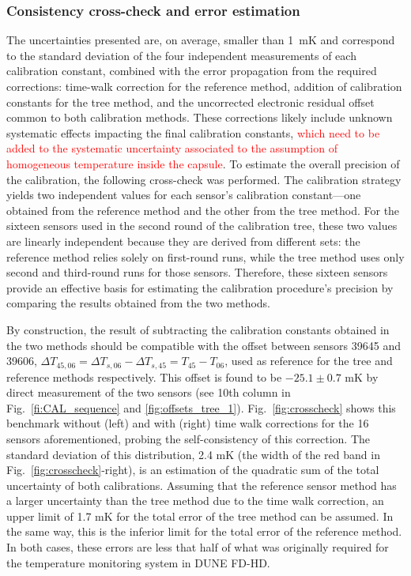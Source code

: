 \subsubsection{Consistency cross-check and error estimation}
\label{sec:crossCheck}
\noindent The uncertainties presented are, on average, smaller than 1~mK and correspond to the standard deviation of the four independent measurements of each calibration constant, combined with the error propagation from the required corrections: time-walk correction for the reference method, addition of calibration constants for the tree method, and the uncorrected electronic residual offset common to both calibration methods. These corrections likely include unknown systematic effects impacting the final calibration constants, \textcolor{red}{which need to be added to the systematic uncertainty associated to the assumption of homogeneous temperature inside the capsule}. To estimate the overall precision of the calibration, the following cross-check was performed. The calibration strategy yields two independent values for each sensor’s calibration constant—one obtained from the reference method and the other from the tree method. For the sixteen sensors used in the second round of the calibration tree, these two values are linearly independent because they are derived from different sets: the reference method relies solely on first-round runs, while the tree method uses only second and third-round runs for those sensors. Therefore, these sixteen sensors provide an effective basis for estimating the calibration procedure’s precision by comparing the results obtained from the two methods.

By construction, the result of subtracting the calibration constants obtained in the two methods should be compatible with the offset between sensors 39645 and 39606, $\Delta T_{45,06} = \Delta T_{s,06}-\Delta T_{s,45} = T_{45}-T_{06}$, used as reference for the tree and reference methods respectively. This offset is found to be $-25.1 \pm 0.7$ mK by direct measurement of the two sensors (see 10th column in Fig.~\ref{fi:CAL_sequence} and \ref{fig:offsets_tree_1}).  Fig.~\ref{fig:crosscheck} shows this benchmark without (left) and with (right) time walk corrections for the 16 sensors aforementioned, probing the self-consistency of this correction. The standard deviation of this distribution, 2.4 mK (the width of the red band in Fig.~\ref{fig:crosscheck}-right), is an estimation of the quadratic sum of the total uncertainty of both calibrations. Assuming that the reference sensor method has a larger uncertainty than the tree method due to the time walk correction, an upper limit of 1.7 mK for the total error of the tree method can be assumed. In the same way, this is the inferior limit for the total error of the reference method. In both cases, these errors are less that half of what was originally required for the temperature monitoring system in DUNE FD-HD.

